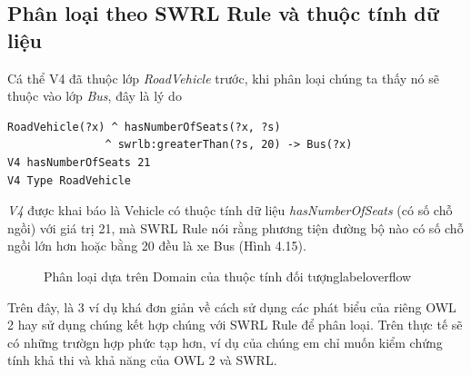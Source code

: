 \subsection{Phân loại theo SWRL Rule và thuộc tính dữ liệu} 
Cá thể V4 đã thuộc lớp \textit{RoadVehicle} trước, khi phân loại chúng ta thấy nó sẽ thuộc vào lớp \textit{Bus}, đây là lý do \begin{verbatim}
RoadVehicle(?x) ^ hasNumberOfSeats(?x, ?s) 
               ^ swrlb:greaterThan(?s, 20) -> Bus(?x)
V4 hasNumberOfSeats 21
V4 Type RoadVehicle
\end{verbatim}
\textit{V4} được khai báo là Vehicle có thuộc tính dữ liệu \textit{hasNumberOfSeats} (có số chỗ ngồi) với giá trị 21, mà SWRL Rule nói rằng phương tiện đường bộ nào có số chỗ ngồi lớn hơn hoặc bằng 20 đều là xe Bus (Hình 4.15).
\begin{figure}[h!]
	\centering
	\caption{Phân loại dựa trên Domain của thuộc tính đối tượnglabel{overflow}}
\end{figure}
Trên đây, là 3 ví dụ khá đơn giản về cách sử dụng các phát biểu của riêng OWL 2 hay sử dụng chúng kết hợp chúng với SWRL Rule để phân loại. Trên thực tế sẽ có những trườgn hợp phức tạp hơn, ví dụ của chúng em chỉ muốn kiểm chứng tính khả thi và khả năng của OWL 2 và SWRL.
